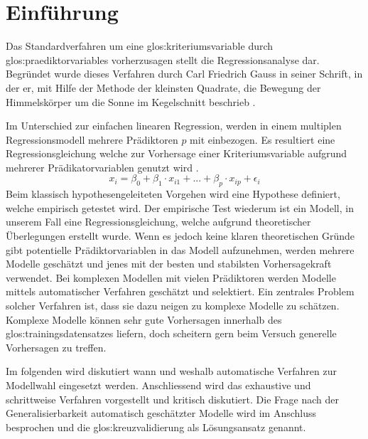 \section{Einführung}
Das Standardverfahren um eine \Gls{glos:kriteriumsvariable} durch \Glspl{glos:praediktorvariable} vorherzusagen stellt die Regressionsanalyse dar.
Begründet wurde dieses Verfahren durch Carl Friedrich Gauss in seiner Schrift, in der er, mit Hilfe der Methode der kleinsten Quadrate, die Bewegung der Himmelskörper um die Sonne im Kegelschnitt beschrieb \cite{gauss1809theoria}. 

Im Unterschied zur einfachen linearen Regression, werden in einem multiplen Regressionsmodell mehrere Prädiktoren $p$ mit einbezogen. 
Es resultiert eine Regressionsgleichung welche zur Vorhersage einer Kriteriumsvariable aufgrund mehrerer Prädikatorvariablen genutzt wird  \cite[S. 448]{bortz2011}. 
\begin{equation}
x_i = \beta_0 + \beta_1\cdot x_{i1} + ... +  \beta_p\cdot x_{ip} + \epsilon_i
\tag{multiple lineare Regression}
\end{equation}
Beim klassisch hypothesengeleiteten Vorgehen wird eine Hypothese definiert, welche empirisch getestet wird.
Der empirische Test wiederum ist ein Modell, in unserem Fall eine Regressionsgleichung, welche aufgrund theoretischer Überlegungen erstellt wurde.
Wenn es jedoch keine klaren theoretischen Gründe gibt potentielle Prädiktorvariablen in das Modell aufzunehmen, werden mehrere Modelle geschätzt und jenes mit der besten und stabilsten Vorhersagekraft verwendet.
Bei komplexen Modellen mit vielen Prädiktoren werden Modelle mittels automatischer Verfahren geschätzt und selektiert.
Ein zentrales Problem solcher Verfahren ist, dass sie dazu neigen zu komplexe Modelle zu schätzen. 
Komplexe Modelle können sehr gute Vorhersagen innerhalb des \Gls{glos:trainingsdatensatz}es liefern, doch scheitern gern beim Versuch generelle Vorhersagen zu treffen.

Im folgenden wird diskutiert wann und weshalb automatische Verfahren zur Modellwahl eingesetzt werden. 
Anschliessend wird das exhaustive und schrittweise Verfahren vorgestellt und kritisch diskutiert.
Die Frage nach der Generalisierbarkeit automatisch geschätzter Modelle wird im Anschluss besprochen und die \Gls{glos:kreuzvalidierung} als Lösungsansatz genannt.